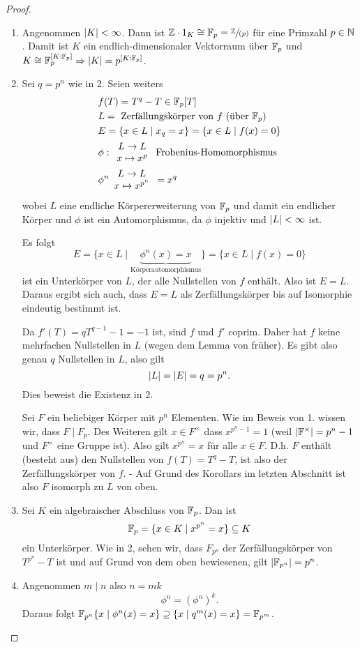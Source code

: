 \begin{proof}
	\begin{enumerate}[1)]
		\item Angenommen $\abs{K} < \infty$. Dann ist $\mathbb{Z} \cdot 1_{K} \cong \mathbb{F}_{p} = \sfrac{\mathbb{Z}}{(p)}$ für eine Primzahl $p \in \mathbb{N}$.
			Damit ist $K$ ein endlich-dimensionaler Vektorraum über $\mathbb{F}_{p}$ und $K \cong  \mathbb{F}_{p}^{[K : \mathbb{F}_{p}]} \Rightarrow  \abs{K} = p^{[K : \mathbb{F}_{p}]}$.
		\item Sei $q = p^{n}$ wie in 2. Seien weiters
			\begin{align*}
				&f(T) = T^{q}- T \in \mathbb{F}_{p}[T]\\
				&L =  \text{ Zerfällungskörper von $f$ (über $\mathbb{F}_p$)}\\
				&E = \{x \in L \mid x_{q} = x\} = \{x \in L \mid f(x) = 0\} \\
				&\phi: \begin{array}{c} L \to L\\ x \mapsto x^{p}\\ \end{array} \text{ Frobenius-Homomorphismus }\\
				&\phi^{n} \begin{array}{c} L \to L\\ x \mapsto x^{p^{n}}\\ \end{array} = x^{q}
			\end{align*}
			wobei $L$ eine endliche Körpererweiterung von $\mathbb{F}_{p}$ und damit ein endlicher Körper und $\phi$ ist ein Automorphismus, da $\phi$ injektiv und $\abs{L} < \infty$ ist.

			Es folgt
			\[
				E = \{x \in L \mid \underbrace{\phi^{n}(x) = x}_{\text{Körperautomorphismus}}\} = \{ x \in L \mid f(x) = 0\} 
			\] 
			ist ein Unterkörper von $L$, der alle Nullstellen von $f$ enthält. Also ist $E = L$.
			Daraus ergibt sich auch, dass $E = L$ als Zerfällungskörper bis auf Isomorphie eindeutig bestimmt ist.

			Da $f'(T) = q T^{q-1} -1 = -1$ ist, sind $f$ und $f'$ coprim.
			Daher hat $f$ keine mehrfachen Nullstellen in $L$ (wegen dem Lemma von früher).
			Es gibt also genau $q$ Nullstellen in $L$, also gilt 
			\[
			\abs{L} = \abs{E}= q = p^{n}
			.\] 
			Dies beweist die Existenz  in  2.

			Sei $F$ ein beliebiger Körper mit $p^{n}$ Elementen. Wie im Beweis von 1. wissen wir, dass $F \mid F_{p}$.
			Des Weiteren gilt $x \in F^{\times}$ dass $x^{p^{n}-1} = 1$ (weil $\abs{\mathbb{F}^{\times }} = p^{n}-1$ und $F^{\times}$ eine Gruppe ist).
			Also gilt $x^{p^{n}} = x$ für alle $x \in F$.
			D.h. $F$ enthält (besteht aus) den Nullstellen von $f(T) = T^{q} - T$,
			ist also der Zerfällungskörper von $f$. - Auf Grund des Korollars im letzten Abschnitt ist also $F$ isomorph 
			zu $L$ von oben.
		\item Sei $K$ ein algebraischer Abschluss von $\mathbb{F}_{p}$. Dan ist
			\[
			\mathbb{F}_{p} = \{ x \in K \mid x^{p^{n}} = x\} \subseteq K
			\] 
			ein Unterkörper. Wie in 2, sehen wir, dass $F_{p^{n}}$ der Zerfällungskörper von $T^{p^{n}} - T$ ist und
			auf Grund von dem oben bewiesenen, gilt $\abs{\mathbb{F}_{p^{n}}} = p^{n}$.
		\item Angenommen $m \mid n$ also $n  = m k$ 
			\[
				\phi^{n} = \left( \phi^{n} \right)^{k}
			.\] 
			Daraus folgt $\mathbb{F}_{p^{n}} \{x \mid \phi^{n}(x) = x\} \supseteq \{x \mid q^{m}(x) = x\} = \mathbb{F}_{p^{m}}$.


\end{enumerate}
\end{proof}
